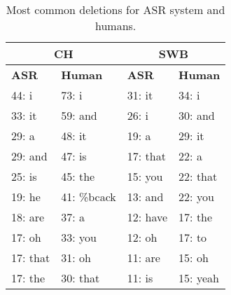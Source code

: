 \documentclass{article}
\begin{document}
\begin{table}[t]
    \centering
\caption{Most common deletions for ASR system and humans.}
\vspace*{0.1in}
\label{tab:dels}
        \small
    \begin{tabular}{|l|l||l|l|}
    \hline
    \multicolumn{2}{|c||}{{\bf CH}} & \multicolumn{2}{c|}{{\bf SWB}} \\ \hline 
                    {\bf ASR}   & {\bf Human}   & {\bf ASR}    & {\bf Human}   \\ \hline \hline
 44:  i  &     73:  i &    31:  it &    34:  i \\ \hline
      33:  it &       59:  and &       26:  i &       30:  and \\ \hline
      29:  a &       48:  it &       19:  a &       29:  it \\ \hline
      29:  and &       47:  is &       17:  that &       22:  a \\ \hline
      25:  is &       45:  the &       15:  you &       22:  that \\ \hline
      19:  he &       41:  \%bcack &       13:  and &       22:  you \\ \hline
      18:  are &       37:  a &       12:  have &       17:  the \\ \hline
      17:  oh &       33:  you &       12:  oh &       17:  to \\ \hline
      17:  that &       31:  oh &       11:  are &       15:  oh \\ \hline
     17:  the &      30:  that &      11:  is &      15:  yeah \\ \hline
        \end{tabular}
\end{table}
\end{document}
